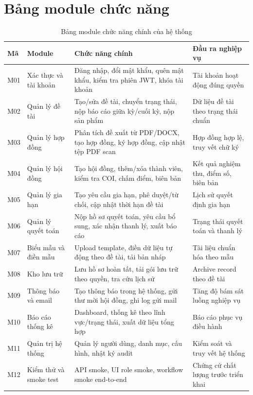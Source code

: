 \documentclass[12pt,a4paper]{report}
\begin{document}
\section{Bảng module chức năng}
\begin{table}[H]
\centering
\small
\begin{tabular}{|C{1.2cm}|L{3.3cm}|L{5.4cm}|L{4.0cm}|}
\hline
\textbf{Mã} & \textbf{Module} & \textbf{Chức năng chính} & \textbf{Đầu ra nghiệp vụ} \\ \hline
M01 & Xác thực và tài khoản & Đăng nhập, đổi mật khẩu, quên mật khẩu, kiểm tra phiên JWT, khóa tài khoản & Tài khoản hoạt động đúng quyền \\ \hline
M02 & Quản lý đề tài & Tạo/sửa đề tài, chuyển trạng thái, nộp báo cáo giữa kỳ/cuối kỳ, nộp sản phẩm & Dữ liệu đề tài theo trạng thái chuẩn \\ \hline
M03 & Quản lý hợp đồng & Phân tích đề xuất từ PDF/DOCX, tạo hợp đồng, ký hợp đồng, cập nhật tệp PDF scan & Hợp đồng hợp lệ, truy vết chữ ký \\ \hline
M04 & Quản lý hội đồng & Tạo hội đồng, thêm/xóa thành viên, kiểm tra COI, chấm điểm, biên bản & Kết quả nghiệm thu, điểm số, biên bản \\ \hline
M05 & Quản lý gia hạn & Tạo yêu cầu gia hạn, phê duyệt/từ chối, cập nhật thời hạn đề tài & Lịch sử quyết định gia hạn \\ \hline
M06 & Quản lý quyết toán & Nộp hồ sơ quyết toán, yêu cầu bổ sung, xác nhận thanh lý, xuất báo cáo & Trạng thái quyết toán và thanh lý \\ \hline
M07 & Biểu mẫu và điền mẫu & Upload template, điền dữ liệu tự động theo đề tài, tải bản nháp & Tài liệu chuẩn hóa theo mẫu \\ \hline
M08 & Kho lưu trữ & Lưu hồ sơ hoàn tất, tải gói lưu trữ theo quyền, tra cứu lịch sử & Archive record theo đề tài \\ \hline
M09 & Thông báo và email & Tạo thông báo trong hệ thống, gửi thư mời hội đồng, ghi log gửi mail & Tăng độ bám sát luồng nghiệp vụ \\ \hline
M10 & Báo cáo thống kê & Dashboard, thống kê theo lĩnh vực/trạng thái, xuất dữ liệu tổng hợp & Báo cáo phục vụ điều hành \\ \hline
M11 & Quản trị hệ thống & Quản lý người dùng, danh mục, cấu hình, nhật ký audit & Kiểm soát và truy vết hệ thống \\ \hline
M12 & Kiểm thử và smoke test & API smoke, UI role smoke, workflow smoke end-to-end & Chứng cứ chất lượng trước triển khai \\ \hline
\end{tabular}
\caption{Bảng module chức năng chính của hệ thống}
\end{table}
\end{document}
